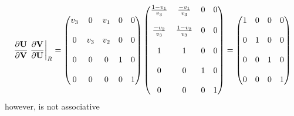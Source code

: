 \documentclass[a4paper]{report}
\begin{document}
\begin{equation}
  \frac{\partial \mathbf U}{\partial \mathbf V} \left. \frac{\partial \mathbf V}{\partial \mathbf U}\right|_{R} = 
  \begin{pmatrix}
    v_3 & 0   & v_1 & 0 & 0 \\ \\
    0   & v_3 & v_2 & 0 & 0 \\ \\
    0   & 0   & 0   & 1 & 0 \\ \\
    0   & 0   & 0   & 0 & 1
  \end{pmatrix}
  \begin{pmatrix}
    \frac{1-v_1}{v_3} & \frac{-v_1}{v_3}  & 0 & 0 \\ \\
    \frac{-v_2}{v_3}  & \frac{1-v_2}{v_3} & 0 & 0 \\ \\
    1                 & 1                 & 0 & 0 \\ \\
    0                 & 0                 & 1 & 0 \\ \\
    0                 & 0                 & 0 & 1
  \end{pmatrix}
  =
  \begin{pmatrix}
    1 & 0 & 0 & 0 \\ \\
    0 & 1 & 0 & 0 \\ \\
    0 & 0 & 1 & 0 \\ \\
    0 & 0 & 0 & 1
  \end{pmatrix}
  \label{dvdu-jac-right-I}
\end{equation}
however,  is not associative
\end{document}
